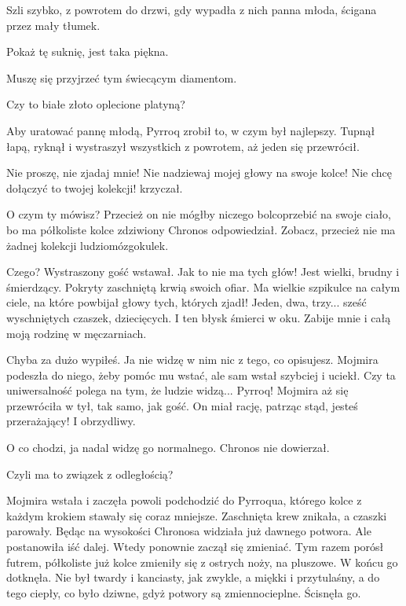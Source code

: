 Szli szybko, z powrotem do drzwi, gdy wypadła z nich panna młoda, ścigana przez mały tłumek.

\ds{} Pokaż tę suknię, jest taka piękna. \de{}

\ds{} Muszę się przyjrzeć tym świecącym diamentom. \de{}

\ds{} Czy to białe złoto oplecione platyną? \de{}

Aby uratować pannę młodą, Pyrroq zrobił to, w czym był najlepszy. Tupnął łapą, ryknął i wystraszył wszystkich z powrotem, aż jeden się przewrócił.

\ds{} Nie proszę, nie zjadaj mnie! Nie nadziewaj mojej głowy na swoje kolce! Nie chcę dołączyć to twojej kolekcji! \dm{} krzyczał. \de{}

\ds{} O czym ty mówisz? Przecież on nie mógłby niczego bolcoprzebić na swoje ciało, bo ma półkoliste kolce\dm{} zdziwiony Chronos odpowiedział. \dm{}
Zobacz, przecież nie ma żadnej kolekcji ludziomózgokulek. \de{}

\ds{} Czego? \dm{} Wystraszony gość wstawał. \dm{} Jak to nie ma tych głów! Jest wielki, brudny i śmierdzący. Pokryty zaschniętą krwią swoich ofiar.
Ma wielkie szpikulce na całym ciele, na które powbijał głowy tych, których zjadł! Jeden, dwa, trzy... sześć wyschniętych czaszek, dziecięcych.
I ten błysk śmierci w oku. Zabije mnie i całą moją rodzinę w męczarniach. \de{}

\ds{} Chyba za dużo wypiłeś. Ja nie widzę w nim nic z tego, co opisujesz. \dm{} Mojmira podeszła do niego, żeby pomóc mu wstać, ale sam wstał szybciej i uciekł. \dm{}
Czy ta uniwersalność polega na tym, że ludzie widzą... Pyrroq! \dm{} Mojmira aż się przewróciła w tył, tak samo, jak gość. \dm{} On miał rację, patrząc stąd, jesteś przerażający! I obrzydliwy. \de{}

\ds{} O co chodzi, ja nadal widzę go normalnego. \dm{} Chronos nie dowierzał. \de{}

\ds{} Czyli ma to związek z odległością? \de{}

Mojmira wstała i zaczęła powoli podchodzić do Pyrroqua, którego kolce z każdym krokiem stawały się coraz mniejsze. Zaschnięta krew znikała, a czaszki parowały. 
Będąc na wysokości Chronosa widziała już dawnego potwora.
Ale postanowiła iść dalej. Wtedy ponownie zaczął się zmieniać.
Tym razem porósł futrem, półkoliste już kolce zmieniły się z ostrych noży, na pluszowe.
W końcu go dotknęła.
Nie był twardy i kanciasty, jak zwykle, a miękki i przytulaśny, a do tego ciepły, co było dziwne, gdyż potwory są zmiennocieplne.
Ścisnęła go.

